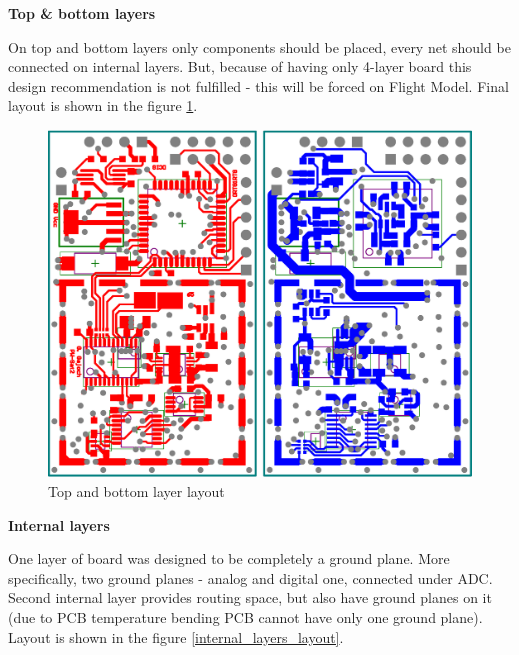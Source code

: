         \bigskip \textbf{Top \& bottom layers}

        On top and bottom layers only components should be placed, every net should be connected on internal layers. But, because of having only 4-layer board this design recommendation is not fulfilled - this will be forced on Flight Model. Final layout is shown in the figure \ref{top_bottom_layer_layout}.

        \begin{figure}[H]
            \centering
            \includegraphics[width=0.6\paperwidth]{img/06/top_bottom_layer_layout.eps}
            \caption{Top and bottom layer layout}
            \label{top_bottom_layer_layout}
        \end{figure}

        \bigskip \textbf{Internal layers}

        One layer of board was designed to be completely a ground plane. More specifically, two ground planes - analog and digital one, connected under ADC. Second internal layer provides routing space, but also have ground planes on it (due to PCB temperature bending PCB cannot have only one ground plane). Layout is shown in the figure \ref{internal_layers_layout}.

